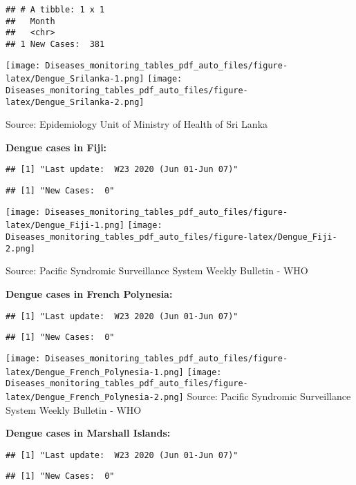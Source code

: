 \documentclass[]{article}
\begin{document}
\begin{verbatim}
## # A tibble: 1 x 1
##   Month          
##   <chr>          
## 1 New Cases:  381
\end{verbatim}

\texttt{[image: Diseases\_monitoring\_tables\_pdf\_auto\_files/figure-latex/Dengue\_Srilanka-1.png]}
\texttt{[image: Diseases\_monitoring\_tables\_pdf\_auto\_files/figure-latex/Dengue\_Srilanka-2.png]}

Source: Epidemiology Unit of Ministry of Health of Sri Lanka

\pagebreak

\textbf{Dengue cases in Fiji:}

\begin{verbatim}
## [1] "Last update:  W23 2020 (Jun 01-Jun 07)"
\end{verbatim}

\begin{verbatim}
## [1] "New Cases:  0"
\end{verbatim}

\texttt{[image: Diseases\_monitoring\_tables\_pdf\_auto\_files/figure-latex/Dengue\_Fiji-1.png]}
\texttt{[image: Diseases\_monitoring\_tables\_pdf\_auto\_files/figure-latex/Dengue\_Fiji-2.png]}

Source: Pacific Syndromic Surveillance System Weekly Bulletin - WHO

\pagebreak

\textbf{Dengue cases in French Polynesia:}

\begin{verbatim}
## [1] "Last update:  W23 2020 (Jun 01-Jun 07)"
\end{verbatim}

\begin{verbatim}
## [1] "New Cases:  0"
\end{verbatim}

\texttt{[image: Diseases\_monitoring\_tables\_pdf\_auto\_files/figure-latex/Dengue\_French\_Polynesia-1.png]}
\texttt{[image: Diseases\_monitoring\_tables\_pdf\_auto\_files/figure-latex/Dengue\_French\_Polynesia-2.png]}
Source: Pacific Syndromic Surveillance System Weekly Bulletin - WHO

\pagebreak

\textbf{Dengue cases in Marshall Islands:}

\begin{verbatim}
## [1] "Last update:  W23 2020 (Jun 01-Jun 07)"
\end{verbatim}

\begin{verbatim}
## [1] "New Cases:  0"
\end{verbatim}
\end{document}
